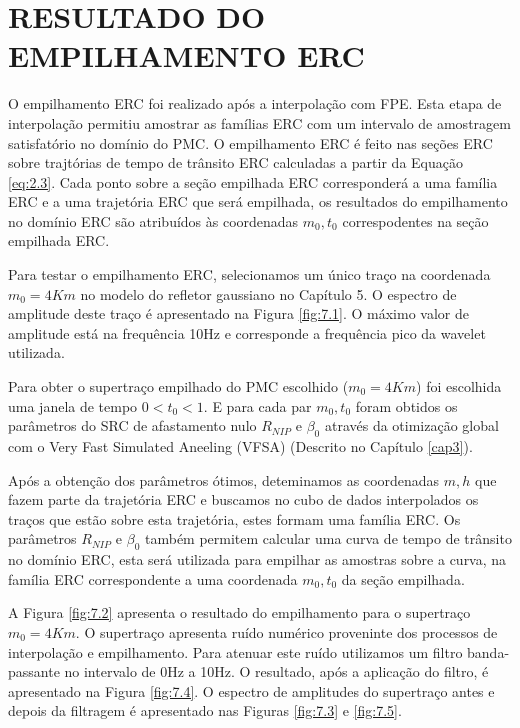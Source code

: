 %
% 
% 
% 
% 
% 
% 

\chapter{RESULTADO DO EMPILHAMENTO ERC}
\label{cap7}

O empilhamento ERC foi realizado após a interpolação com FPE. Esta etapa de
interpolação permitiu amostrar as famílias ERC com um intervalo de amostragem satisfatório no
domínio do PMC. O empilhamento ERC é feito nas seções ERC sobre trajtórias de tempo de trânsito ERC calculadas
a partir da Equação \ref{eq:2.3}. 
Cada ponto sobre a seção empilhada ERC corresponderá a uma família ERC e a uma trajetória ERC que será empilhada,
os resultados do empilhamento no domínio
ERC são atribuídos às coordenadas $m_0,t_0$ correspodentes na seção empilhada ERC.

Para testar o empilhamento ERC, selecionamos um único traço na coordenada $m_0=4Km$ no modelo do refletor
gaussiano no Capítulo 5. O espectro de amplitude deste traço é apresentado na Figura \ref{fig:7.1}.
O máximo valor de amplitude está na frequência 10Hz e corresponde a frequência pico da wavelet utilizada.

Para obter o supertraço empilhado do PMC escolhido ($m_0=4Km$) foi escolhida uma janela de tempo $0<t_0<1$.
E para cada par $m_0, t_0$ foram obtidos os parâmetros do SRC de afastamento nulo $R_{NIP}$ e $\beta_0$ 
através da otimização global com o Very Fast Simulated Aneeling (VFSA) (Descrito no Capítulo \ref{cap3}).

Após a obtenção dos parâmetros ótimos, deteminamos as coordenadas $m, h$ que fazem parte da trajetória ERC
e buscamos no cubo de dados interpolados os traços que estão sobre esta trajetória, estes formam uma família ERC.
Os parâmetros $R_{NIP}$ e $\beta_0$ também permitem calcular uma curva de tempo de trânsito no domínio ERC, esta será utilizada
para empilhar as amostras sobre a curva, na família ERC correspondente a uma coordenada $m_0, t_0$ da seção empilhada.

A Figura \ref{fig:7.2} apresenta o resultado do empilhamento para o supertraço $m_0=4Km$. O supertraço apresenta ruído numérico
proveninte dos processos de interpolação e empilhamento. Para atenuar este ruído utilizamos um filtro banda-passante no 
intervalo de 0Hz a 10Hz. O resultado, após a aplicação do filtro, é apresentado na Figura \ref{fig:7.4}. O espectro de amplitudes
do supertraço antes e depois da filtragem é apresentado nas Figuras \ref{fig:7.3} e \ref{fig:7.5}.


